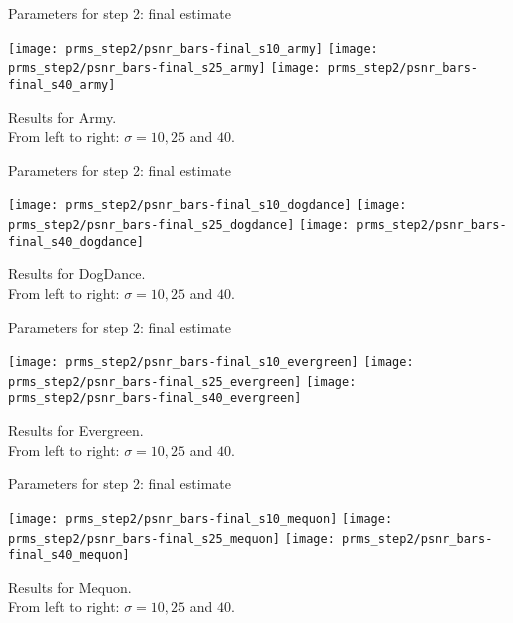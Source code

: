 \documentclass[mathserif, 8pt]{beamer}
\makeatletter
\newcounter{multipleslide}
\newcommand{\multipleframe}{%
\setcounter{multipleslide}{\value{framenumber}}
\stepcounter{multipleslide}
\patchcmd{\beamer@@tmpl@footline}%
	{\insertframenumber}%
	{\themultipleslide}%
	{}%
	{}%
}
\makeatother
\begin{document}
\multipleframe
\begin{frame}{Parameters for step 2: final estimate}
	\begin{center}
		\texttt{[image: prms\_step2/psnr\_bars-final\_s10\_army]}%
		\texttt{[image: prms\_step2/psnr\_bars-final\_s25\_army]}%
		\texttt{[image: prms\_step2/psnr\_bars-final\_s40\_army]}

		\bigskip

		Results for Army.\\From left to right: $\sigma = 10, 25$ and $40$.
	\end{center}
\end{frame}

\begin{frame}{Parameters for step 2: final estimate}
	\begin{center}
		\texttt{[image: prms\_step2/psnr\_bars-final\_s10\_dogdance]}%
		\texttt{[image: prms\_step2/psnr\_bars-final\_s25\_dogdance]}%
		\texttt{[image: prms\_step2/psnr\_bars-final\_s40\_dogdance]}

		\bigskip

		Results for DogDance.\\From left to right: $\sigma = 10, 25$ and $40$.
	\end{center}
\end{frame}

\begin{frame}{Parameters for step 2: final estimate}
	\begin{center}
		\texttt{[image: prms\_step2/psnr\_bars-final\_s10\_evergreen]}%
		\texttt{[image: prms\_step2/psnr\_bars-final\_s25\_evergreen]}%
		\texttt{[image: prms\_step2/psnr\_bars-final\_s40\_evergreen]}

		\bigskip

		Results for Evergreen.\\From left to right: $\sigma = 10, 25$ and $40$.
	\end{center}
\end{frame}

\begin{frame}{Parameters for step 2: final estimate}
	\begin{center}
		\texttt{[image: prms\_step2/psnr\_bars-final\_s10\_mequon]}%
		\texttt{[image: prms\_step2/psnr\_bars-final\_s25\_mequon]}%
		\texttt{[image: prms\_step2/psnr\_bars-final\_s40\_mequon]}

		\bigskip

		Results for Mequon.\\From left to right: $\sigma = 10, 25$ and $40$.
	\end{center}
\end{frame}
\end{document}
